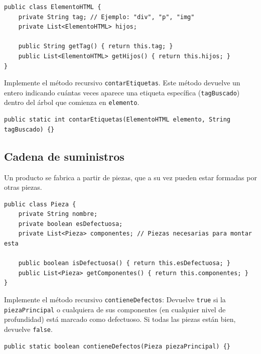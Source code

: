 \documentclass[a4paper]{article}
\newcommand{\code}[1]{\texttt{#1}}
\begin{document}
\begin{verbatim}
public class ElementoHTML {
    private String tag; // Ejemplo: "div", "p", "img"
    private List<ElementoHTML> hijos;

    public String getTag() { return this.tag; }
    public List<ElementoHTML> getHijos() { return this.hijos; }
}
\end{verbatim}

Implemente el método recursivo \code{contarEtiquetas}. Este método devuelve un entero indicando cuántas veces aparece una etiqueta específica (\code{tagBuscado}) dentro del árbol que comienza en \code{elemento}.

\begin{verbatim}
public static int contarEtiquetas(ElementoHTML elemento, String tagBuscado) {}
\end{verbatim}

\subsection{Cadena de suministros}

Un producto se fabrica a partir de piezas, que a su vez pueden estar formadas por otras piezas.

\begin{verbatim}
public class Pieza {
    private String nombre;
    private boolean esDefectuosa;
    private List<Pieza> componentes; // Piezas necesarias para montar esta

    public boolean isDefectuosa() { return this.esDefectuosa; }
    public List<Pieza> getComponentes() { return this.componentes; }
}
\end{verbatim}

Implemente el método recursivo \code{contieneDefectos}: Devuelve \code{true} si la \code{piezaPrincipal} o cualquiera de sus componentes (en cualquier nivel de profundidad) está marcado como defectuoso. Si todas las piezas están bien, devuelve \code{false}.

\begin{verbatim}
public static boolean contieneDefectos(Pieza piezaPrincipal) {}
\end{verbatim}
\end{document}
